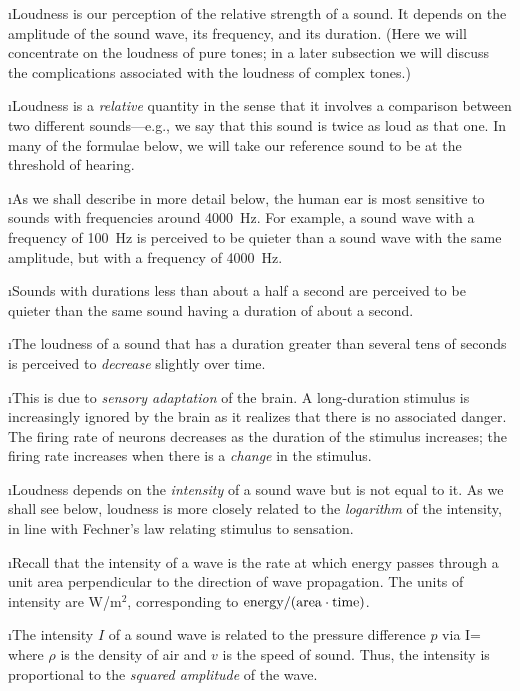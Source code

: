 \i Loudness is our perception of the relative 
strength of a sound.
It depends on the amplitude of the sound wave,
its frequency, and its duration.
(Here we will concentrate on the loudness of 
pure tones; in a later subsection we will discuss
the complications associated with the loudness of 
complex tones.)

\i Loudness is a {\em relative} quantity in 
the sense that it involves a comparison between 
two different sounds---e.g., we say that this 
sound is twice as loud as that one.
In many of the formulae below, we will take our 
reference sound to be at the threshold of hearing.

\i As we shall describe in more detail below,
the human ear is most sensitive to sounds
with frequencies around 4000~Hz.
For example, a sound wave with a frequency of
100~Hz is perceived to be quieter than 
a sound wave with the same amplitude, 
but with a frequency of 4000~Hz.

\i Sounds with durations less than about a half
a second are perceived to be quieter than the 
same sound having a duration of about a second.

\i The loudness of a sound that has 
a duration greater than several tens of seconds 
is perceived to {\em decrease} slightly over time.

\i This is due to {\em sensory adaptation} of
the brain.
A long-duration stimulus is increasingly ignored
by the brain as it realizes that there is no 
associated danger.
The firing rate of neurons decreases as the
duration of the stimulus increases;
the firing rate increases when there is a {\em change} 
in the stimulus.

\i Loudness depends on the {\em intensity} of
a sound wave but is not equal to it.
As we shall see below, loudness is more closely
related to the {\em logarithm} of the intensity, 
in line with Fechner's law relating stimulus 
to sensation.

\i Recall that the intensity of a wave is the
rate at which energy passes through a unit area
perpendicular to the direction of wave propagation.
The units of intensity are W/m$^2$, corresponding 
to ${\rm energy}/({\rm area}\cdot{\rm time})$.

\i The intensity $I$ of a sound wave is related to 
the pressure difference $p$ via
%
\be
I= 
\label{e:Ivsrho2}
\ee
%
where $\rho$ is the density of air and $v$ is the speed 
of sound.
Thus, the intensity is proportional to the 
{\em squared amplitude} of the wave.

